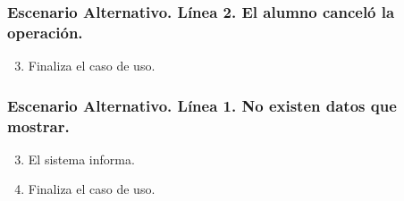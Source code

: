 \subsubsection{Escenario Alternativo. L\'{i}nea 2. El alumno cancel\'{o} la operaci\'{o}n.}
\begin{enumerate}
\setcounter{enumi}{2}
\item Finaliza el caso de uso.
\end{enumerate}

\subsubsection{Escenario Alternativo. L\'{i}nea 1. No existen datos que mostrar.}
\begin{enumerate}
\setcounter{enumi}{2}
\item El sistema informa.
\item Finaliza el caso de uso.
\end{enumerate}
